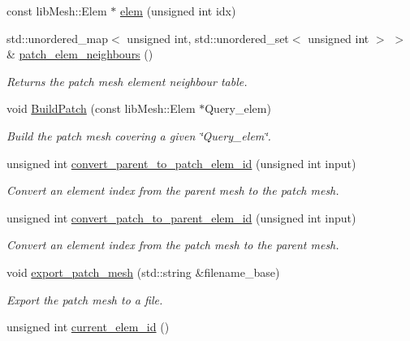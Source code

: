 \begin{DoxyCompactItemize}
const lib\+Mesh\+::\+Elem $\ast$ \hyperlink{classcarl_1_1_patch__construction_acb065fa34010bcf379156ccf8228e01c}{elem} (unsigned int idx)
\item 
std\+::unordered\+\_\+map$<$ unsigned int, std\+::unordered\+\_\+set$<$ unsigned int $>$ $>$ \& \hyperlink{classcarl_1_1_patch__construction_a675b7d3796e5001b86f68dbd39c2ed82}{patch\+\_\+elem\+\_\+neighbours} ()
\begin{DoxyCompactList}\small\item\em Returns the patch mesh element neighbour table. \end{DoxyCompactList}\item 
void \hyperlink{classcarl_1_1_patch__construction_aebb82c6e34f4cf38cf3e4ef2ac32b664}{Build\+Patch} (const lib\+Mesh\+::\+Elem $\ast$Query\+\_\+elem)
\begin{DoxyCompactList}\small\item\em Build the patch mesh covering a given \char`\"{}\+Query\+\_\+elem\char`\"{}. \end{DoxyCompactList}\item 
unsigned int \hyperlink{classcarl_1_1_patch__construction_a8a9aeee662261f537ed663addcce6a5a}{convert\+\_\+parent\+\_\+to\+\_\+patch\+\_\+elem\+\_\+id} (unsigned int input)
\begin{DoxyCompactList}\small\item\em Convert an element index from the parent mesh to the patch mesh. \end{DoxyCompactList}\item 
unsigned int \hyperlink{classcarl_1_1_patch__construction_a7d217e3d0eb0c2711039d019824ff5b8}{convert\+\_\+patch\+\_\+to\+\_\+parent\+\_\+elem\+\_\+id} (unsigned int input)
\begin{DoxyCompactList}\small\item\em Convert an element index from the patch mesh to the parent mesh. \end{DoxyCompactList}\item 
void \hyperlink{classcarl_1_1_patch__construction_a17cadf2879f8a7b2ef7a59dadd9d5b72}{export\+\_\+patch\+\_\+mesh} (std\+::string \&filename\+\_\+base)
\begin{DoxyCompactList}\small\item\em Export the patch mesh to a file. \end{DoxyCompactList}\item 
unsigned int \hyperlink{classcarl_1_1_patch__construction_aa2653050fa786fa5c6535bbfc5f3dbf4}{current\+\_\+elem\+\_\+id} ()
\item 

\end{DoxyCompactItemize}
